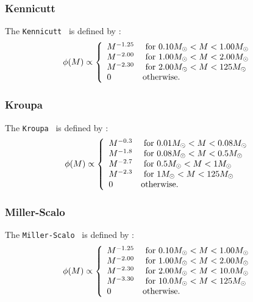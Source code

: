 \subsubsection{Kennicutt}

The {\tt Kennicutt} \IMF\ is defined by \citep{kennicutt_rate_1983}:
\begin{equation}
 \phi(M) \propto \left\{ \begin{array}{ll}
 M^{-1.25} & \hbox{ for } 0.10M_\odot < M < 1.00M_\odot \\
 M^{-2.00} & \hbox{ for } 1.00M_\odot < M < 2.00M_\odot \\
 M^{-2.30} & \hbox{ for } 2.00M_\odot < M < 125M_\odot \\
 0 & \hbox {otherwise.} \end{array} \right.
\end{equation}

\subsubsection{Kroupa}

The {\tt Kroupa} \IMF\ is defined by \citep{kroupa_variation_2001}:
\begin{equation}
 \phi(M) \propto \left\{ \begin{array}{ll}
 M^{-0.3} & \hbox{ for } 0.01M_\odot < M < 0.08M_\odot \\ 
 M^{-1.8} & \hbox{ for } 0.08M_\odot < M < 0.5M_\odot \\ 
 M^{-2.7} & \hbox{ for } 0.5M_\odot < M < 1M_\odot \\ 
 M^{-2.3} & \hbox{ for } 1M_\odot < M < 125M_\odot \\ 
0 & \hbox {otherwise.} \end{array} \right.
\end{equation}

\subsubsection{Miller-Scalo}

The {\tt Miller-Scalo} \IMF\ is defined by \citep{miller_initial_1979}:
\begin{equation}
 \phi(M) \propto \left\{ \begin{array}{ll}
 M^{-1.25} & \hbox{ for } 0.10M_\odot < M < 1.00M_\odot \\
 M^{-2.00} & \hbox{ for } 1.00M_\odot < M < 2.00M_\odot \\
 M^{-2.30} & \hbox{ for } 2.00M_\odot < M < 10.0M_\odot \\
 M^{-3.30} & \hbox{ for } 10.0M_\odot < M < 125M_\odot \\
 0 & \hbox {otherwise.} \end{array} \right.
\end{equation}

